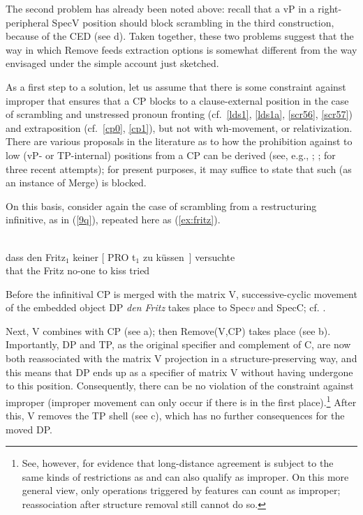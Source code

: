 \documentclass[output=paper]{langsci/langscibook}
\begin{document}
The second problem has already been noted above: recall that a vP in a
right-peripheral SpecV position should block scrambling in the third
construction, because of the \gls{CED} (see d). Taken together,
these two problems suggest that the way in which Remove feeds extraction
options is somewhat different from the way envisaged under the simple account
just sketched.

As a first step to a solution, let us assume that there is some constraint
against improper  that ensures that a CP blocks  to a
clause-external position in the case of scrambling and unstressed pronoun
fronting (cf.\ \ref{lds1}, \ref{lds1a}, \ref{scr56}, \ref{scr57}) and
extraposition (cf.\ \ref{cp0}, \ref{cp1}), but not with wh-movement,
 or relativization.  There are various proposals in the
literature as to how the prohibition against  to low (vP- or
TP-internal) positions from a CP can be derived (see, e.g.,
\citealt[Ch.~2]{Mueller:14:buf}; \citealt{Wurmbrand:15}; \citealt{Keine:16}
for three recent attempts); for present purposes, it may suffice to state that
such  (as an instance of Merge) is blocked.

On this basis, consider again the case of scrambling from a restructuring
infinitive, as in (\ref{9q}), repeated here as (\ref{ex:fritz}).

\ea\label{ex:fritz} \\
    \gll dass \label{fdsc4}den Fritz$_1$ keiner [ PRO t$_1$ zu küssen~] versuchte\\
        that the Fritz\textsubscript{\Acc} no-one\textsubscript{\Nom} {} {} {}  to kiss tried\\
\z

Before the infinitival CP is merged with the matrix V, successive-cyclic
movement of the embedded object DP {\itshape den Fritz} takes place to Spec\emph{v}
and SpecC; cf. .

Next, V combines with CP (see a); then Remove(V,CP) takes place
(see b). Importantly, DP and TP, as the original specifier and
complement of C, are now both reassociated with the matrix V projection in a
structure-preserving way, and this means that DP ends up as a specifier of
matrix V without having undergone  to this position. Consequently,
there can be no violation of the constraint against improper  (improper
movement can only occur if there is  in the first place).\footnote{See,
    however, \citet{Keine:16} for evidence that long-distance
    agreement is
    subject to the same kinds of restrictions as  and can also qualify
    as improper. On this more general view, only operations triggered by
features can count as improper; reassociation after structure removal still
cannot do so.} After this, V removes the TP shell (see c), which
has no further consequences for the moved DP.
\end{document}
